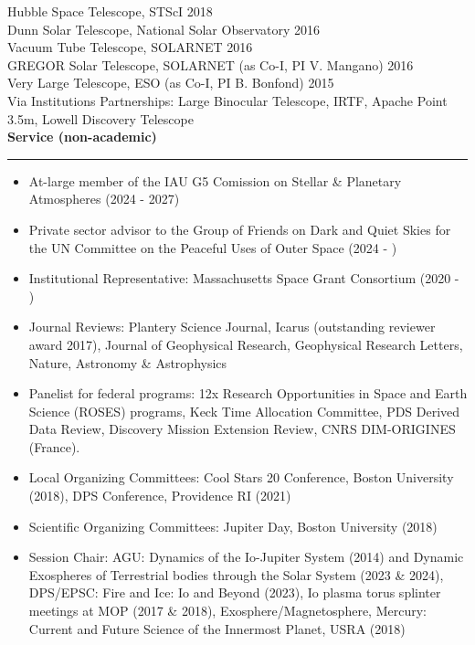 \documentclass[12pt]{report}
\begin{document}
Hubble Space Telescope, STScI \hfill 2018\\
Dunn Solar Telescope, National Solar Observatory \hfill 2016\\
Vacuum Tube Telescope, SOLARNET \hfill 2016\\
GREGOR Solar Telescope, SOLARNET (as Co-I, PI V. Mangano) \hfill 2016\\
Very Large Telescope, ESO (as Co-I, PI B. Bonfond) \hfill 2015\\
Via Institutions Partnerships: Large Binocular Telescope, IRTF, Apache Point 3.5m, Lowell Discovery Telescope\\

\noindent\bf{Service (non-academic)}\rm \hspace*{\fill} \\
\rule{\textwidth}{1pt}
\begin{itemize} \itemsep -2pt %
  \item At-large member of the IAU G5 Comission on Stellar \& Planetary Atmospheres (2024 - 2027)
  \item Private sector advisor to the Group of Friends on Dark and Quiet Skies for the UN Committee on the Peaceful Uses of Outer Space (2024 - )
  \item Institutional Representative: Massachusetts Space Grant Consortium (2020 - )
  \item Journal Reviews: Plantery Science Journal, Icarus (outstanding reviewer award 2017), Journal of Geophysical Research, Geophysical Research Letters, Nature, Astronomy \& Astrophysics
  \item Panelist for federal programs: 12x Research Opportunities in Space and Earth Science (ROSES) programs, Keck Time Allocation Committee, PDS Derived Data Review, Discovery Mission Extension Review,  CNRS DIM-ORIGINES (France).
  \item Local Organizing Committees: Cool Stars 20 Conference, Boston University (2018), DPS Conference, Providence RI (2021)
  \item Scientific Organizing Committees: Jupiter Day, Boston University (2018)
  \item Session Chair: AGU: Dynamics of the Io-Jupiter System (2014) and Dynamic Exospheres of Terrestrial bodies through the Solar System (2023 \& 2024), DPS/EPSC: Fire and Ice: Io and Beyond (2023), Io plasma torus splinter meetings at MOP (2017 \& 2018), Exosphere/Magnetosphere, Mercury: Current and Future Science of the Innermost Planet, USRA (2018)
\end{itemize}
\vspace{2 mm}
\end{document}
